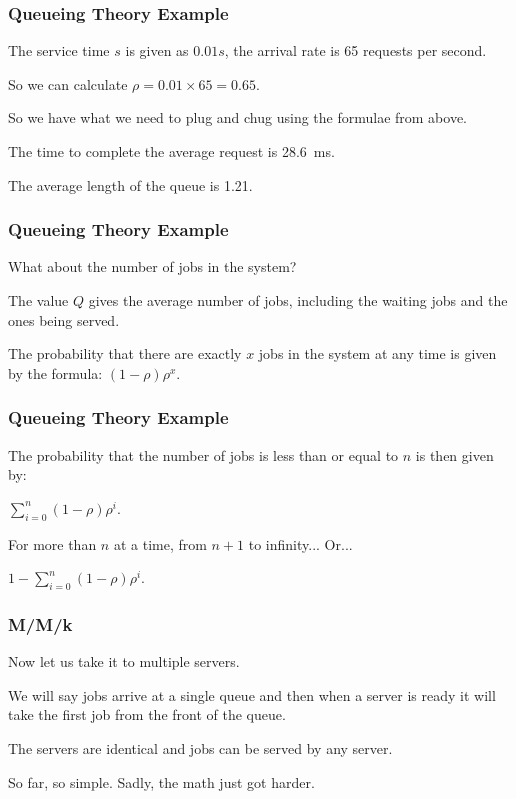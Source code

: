 \begin{frame}
\frametitle{Queueing Theory Example}

The service time $s$ is given as $0.01s$, the arrival rate is 65 requests per second. 

So we can calculate $\rho = 0.01 \times 65 = 0.65$. 

So we have what we need to plug and chug using the formulae from above. 

The time to complete the average request is 28.6~ms. 

The average length of the queue is 1.21.

\end{frame}



\begin{frame}
\frametitle{Queueing Theory Example}

What about the number of jobs in the system? 

The value $Q$ gives the average number of jobs, including the waiting jobs and the ones being served.  

The probability that there are exactly $x$ jobs in the system at any time is given by the formula: $(1-\rho)\rho^{x}$.

\end{frame}



\begin{frame}
\frametitle{Queueing Theory Example}

The probability that the number of jobs is less than or equal to $n$ is then given by: 

$\sum\limits_{i=0}^{n}(1-\rho)\rho^{i}$.

For more than $n$ at a time, from $n+1$ to infinity... Or...

$1 - \sum\limits_{i=0}^{n}(1-\rho)\rho^{i}$.

\end{frame}



\begin{frame}
\frametitle{M/M/k}

Now let us take it to multiple servers. 

We will say jobs arrive at a single queue and then when a server is ready it will take the first job from the front of the queue. 

The servers are identical and jobs can be served by any server. 

So far, so simple. Sadly, the math just got harder. 

\end{frame}




